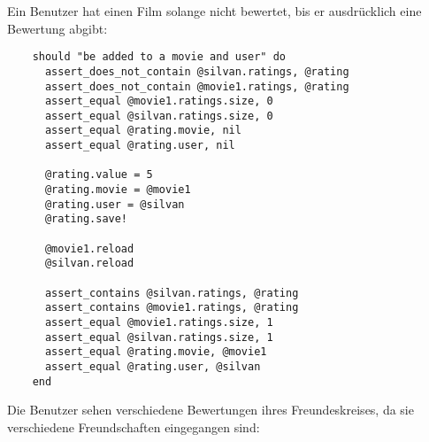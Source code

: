 Ein Benutzer hat einen Film solange nicht bewertet, bis er ausdrücklich
eine Bewertung abgibt:

\begin{verbatim}
    should "be added to a movie and user" do
      assert_does_not_contain @silvan.ratings, @rating
      assert_does_not_contain @movie1.ratings, @rating
      assert_equal @movie1.ratings.size, 0
      assert_equal @silvan.ratings.size, 0
      assert_equal @rating.movie, nil
      assert_equal @rating.user, nil
      
      @rating.value = 5
      @rating.movie = @movie1
      @rating.user = @silvan
      @rating.save!
      
      @movie1.reload
      @silvan.reload
      
      assert_contains @silvan.ratings, @rating
      assert_contains @movie1.ratings, @rating
      assert_equal @movie1.ratings.size, 1
      assert_equal @silvan.ratings.size, 1
      assert_equal @rating.movie, @movie1
      assert_equal @rating.user, @silvan
    end
\end{verbatim}

Die Benutzer sehen verschiedene Bewertungen ihres Freundeskreises, da sie
verschiedene Freundschaften eingegangen sind:

